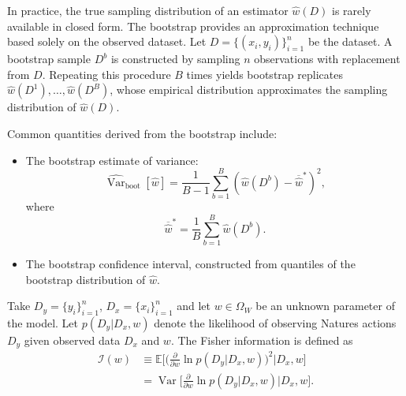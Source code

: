 \begin{example}
	In practice, the true sampling distribution of an estimator $\hat{w}(D)$ is rarely available in closed form. The bootstrap provides an approximation technique based solely on the observed dataset. Let $D = \{(x_i,y_i)\}_{i=1}^n$ be the dataset. A bootstrap sample $D^{b}$ is constructed by sampling $n$ observations with replacement from $D$. Repeating this procedure $B$ times yields bootstrap replicates $\hat{w}(D^{1}), \ldots, \hat{w}(D^{B})$, whose empirical distribution approximates the sampling distribution of $\hat{w}(D)$. 
	
	Common quantities derived from the bootstrap include:
	\begin{itemize}
		\item The bootstrap estimate of variance:
		\begin{equation}
			\widehat{\operatorname{Var}}_{\mathrm{boot}}[\hat{w}] = \frac{1}{B-1}\sum_{b=1}^B \left(\hat{w}(D^{b}) - \overline{\hat{w}}^{*}\right)^2,
		\end{equation}
		where
		\begin{equation}
			\overline{\hat{w}}^{*} = \frac{1}{B}\sum_{b=1}^B \hat{w}(D^{b}).
		\end{equation}
		\item The bootstrap confidence interval, constructed from quantiles of the bootstrap distribution of $\hat{w}$.
	\end{itemize}
\end{example}

\newpage
\begin{definition}
	\label{def:fisher_information}
	Take $D_y= \{y_i\}_{i=1}^n$, $D_x= \{x_i\}_{i=1}^n$ and let $w \in \Omega_W$ be an unknown parameter of the model. Let $p(D_y | D_x, w)$ denote the likelihood of observing Natures actions $D_y$ given observed data $D_x$ and $w$. The Fisher information is defined as
	\begin{equation}
		\begin{split}
			\mathcal{I}(w) &\equiv \mathbb{E} \bigg[\bigg(\frac{\partial}{\partial w} \ln p(D_y|D_x, w)\bigg)^2 \Bigg| D_x, w\bigg]\\
			&= \operatorname{Var}\bigg[\frac{\partial}{\partial w} \ln p(D_y|D_x, w) \Bigg| D_x, w\bigg].
		\end{split}
	\end{equation}
\end{definition}

